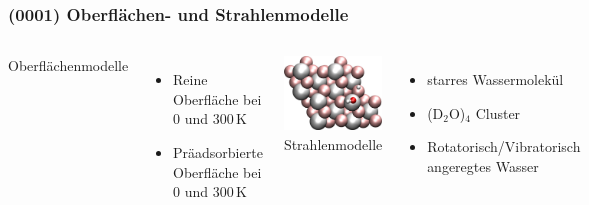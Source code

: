 \documentclass[hyperref={pdfpagelabels=false}]{beamer}
\begin{document}
\begin{frame}
 \frametitle{(0001) Oberflächen- und Strahlenmodelle}
 \begin{columns}
  Oberflächenmodelle
  \begin{itemize}
   \item Reine Oberfläche bei $0$ und $300\,$K
   \item Präadsorbierte Oberfläche bei $0$ und $300\,$K
  \end{itemize} 
  \centering
\includegraphics[width=1.\textwidth]{figures/0001_1-2-diss_top.jpg}
\newline
\pause
  Strahlenmodelle
  \begin{itemize}
   \item starres Wassermolekül
   \item (D$_2$O)$_4$ Cluster
   \item Rotatorisch/Vibratorisch angeregtes Wasser
  \end{itemize}
   \centering
 \includegraphics[width=0.5\textwidth]{figures/perspective+h2o_new.png}
\end{columns}
\end{frame}
\end{document}
